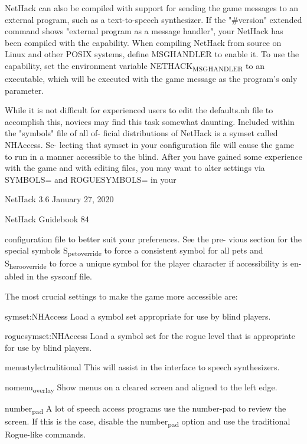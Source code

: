 \documentclass[11pt]{article}
\begin{document}
   NetHack can also be compiled with support for sending the
game messages to an external program, such as a text-to-speech
synthesizer. If the "\#version" extended command shows "external
program as a message handler", your NetHack has been compiled
with the capability. When compiling NetHack from source on Linux
and other POSIX systems, define MSGHANDLER to enable it. To use
the capability, set the environment variable NETHACK\textsubscript{MSGHANDLER}
to an executable, which will be executed with the game message as
the program's only parameter.

   While it is not difficult for experienced users to edit the
defaults.nh file to accomplish this, novices may find this task
somewhat daunting. Included within the "symbols" file of all of-
ficial distributions of NetHack is a symset called NHAccess. Se-
lecting that symset in your configuration file will cause the
game to run in a manner accessible to the blind. After you have
gained some experience with the game and with editing files, you
may want to alter settings via SYMBOLS= and ROGUESYMBOLS= in your


NetHack 3.6                   January 27, 2020





NetHack Guidebook                       84



configuration file to better suit your preferences. See the pre-
vious section for the special symbols S\textsubscript{pet}\textsubscript{override} to force a
consistent symbol for all pets and S\textsubscript{hero}\textsubscript{override} to force a
unique symbol for the player character if accessibility is en-
abled in the sysconf file.

   The most crucial settings to make the game more accessible
are:

symset:NHAccess
 Load a symbol set appropriate for use by blind players.

roguesymset:NHAccess
 Load a symbol set for the rogue level that is appropriate for
 use by blind players.

menustyle:traditional
 This will assist in the interface to speech synthesizers.

nomenu\textsubscript{overlay}
 Show menus on a cleared screen and aligned to the left edge.

number\textsubscript{pad}
 A lot of speech access programs use the number-pad to review
 the screen. If this is the case, disable the number\textsubscript{pad} option
 and use the traditional Rogue-like commands.
\end{document}
